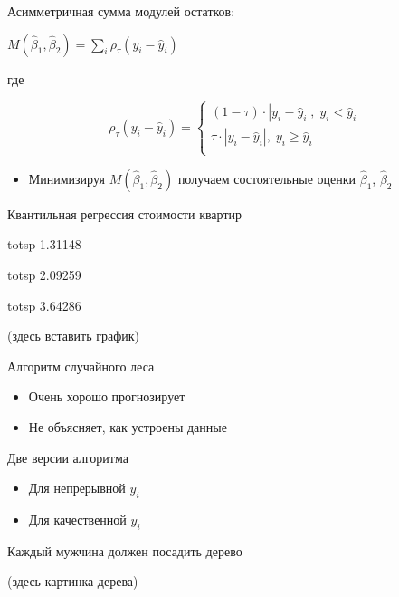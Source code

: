 \documentclass[ignorenonframetext,]{beamer}
\newcommand{\hy}{\hat{y}}
\newcommand{\hb}{\hat{\beta}}
\begin{document}
\begin{frame}{Асимметричная сумма модулей остатков:}

\(M(\hb_1,\hb_2)=\sum_i \rho_{\tau}(y_i - \hy_i)\)

где

\[
\rho_{\tau}(y_i-\hy_i)=\begin{cases}
(1-\tau) \cdot |y_i - \hy_i|, \; y_i < \hy_i \\
\tau \cdot |y_i - \hy_i|, \; y_i \geq \hy_i \\
\end{cases}
\]

\begin{itemize}
\itemsep1pt\parskip0pt
\item
  Минимизируя \(M(\hb_1,\hb_2)\) получаем состоятельные оценки
  \(\hb_1\), \(\hb_2\)
\end{itemize}

\end{frame}

\begin{frame}{Квантильная регрессия стоимости квартир}

totsp 1.31148

totsp 2.09259

totsp 3.64286

(здесь вставить график)

\end{frame}

\begin{frame}{Алгоритм случайного леса}

\begin{itemize}
\item
  Очень хорошо прогнозирует
\item
  Не объясняет, как устроены данные
\end{itemize}

\end{frame}

\begin{frame}{Две версии алгоритма}

\begin{itemize}
\item
  Для непрерывной \(y_i\)
\item
  Для качественной \(y_i\)
\end{itemize}

\end{frame}

\begin{frame}{Каждый мужчина должен посадить дерево}

(здесь картинка дерева)

\end{frame}
\end{document}
